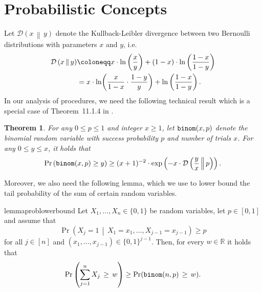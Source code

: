 \documentclass[letterpaper,11pt]{article}
\newcommand{\1}[1]{\mathds{1}\left[#1\right]}
\newcommand{\prbinom}{\textnormal{\texttt{binom}}}
\newcommand{\D}[2]{\mathcal{D}\left(#1\, \middle\|\,#2 \right)}
\newtheorem{theorem}{Theorem}[section]
\begin{document}
\section{Probabilistic Concepts}
\label{sec:prob_results}
Let $\D{x}{y}$ denote the Kullback-Leibler divergence between two Bernoulli distributions with parameters $x$ and $y$, i.e.
\begin{align}
	\D{x}{y} &\coloneqq x\cdot \ln\left( \frac{x}{y} \right)   + (1-x) \cdot \ln\left( \frac{1 - x}{1 - y} \right)\notag\\
		 &= x \cdot \ln\biggl(\frac{x}{1 - x} \cdot \frac{1 - y}{y}\biggr) + \ln\left( \frac{1 - x}{1 - y} \right).\label{eq:KL_div_equiv_form} 
\end{align}
In our analysis of procedures, we need the following technical result which is a special case of Theorem~11.1.4 in
\cite{ElementsInformationTheorya}.
\begin{theorem}\label{theorem:binom_lb}
	For any $0 \leq p \leq 1$ and integer $x \geq 1$, let $\prbinom(x,p)$ denote the binomial random variable with success probability $p$ and number of trials $x$. For any $0 \leq y \leq x$, it holds that
	\begin{align*}
		\Pr\left( \prbinom(x,p) \geq y \right) \geq (x + 1)^{-2} \cdot \exp\left( -x \cdot \D{\frac{y}{x}}{p} \right).
	\end{align*}
\end{theorem}

Moreover, we also need the following lemma, which we use to lower bound the tail probability of the sum of certain random variables.

\begin{restatable}{lemma}{problowerbound}
\label{lemma:prob_lower_bound}
	\label{lem:prob_lem}
	Let $X_1,\ldots, X_n\in \{0,1\}$ be random variables, let $p\in [0,1]$
	and assume that 
	\begin{equation*}
		\Pr\left( X_j =1\,\middle|\, X_1 = x_1,\ldots,X_{j-1}
	= x_{j - 1}\right)\geq p
	\end{equation*}
	for all $j\in [n]$ and $\left( x_1, \ldots,
x_{j-1} \right)  \in \{0,1\}^{j-1}$. Then, for every $w\in \mathbb{R}$
it holds that
\begin{equation*}
	\Pr\left( \sum_{j=1}^n X_j \,\geq\, w\right) \geq
\Pr(\prbinom(n,p)\,\geq\, w).
\end{equation*}
\end{restatable}
\end{document}
